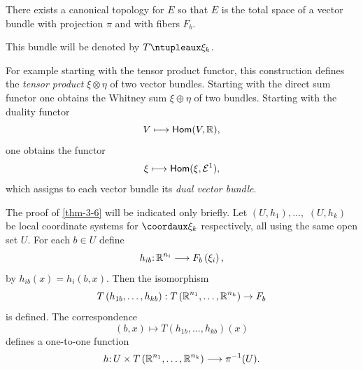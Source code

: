 \begin{theorem}\label{thm-3-6}
	There exists a canonical topology for $E$ so
	that $E$ is the total space of a vector bundle with projection $\pi$
	and with fibers $F_b$.
\end{theorem}
\begin{definition}\label{def:3-5}
	This bundle will be denoted by $T\ntuple{\xi_k}$.
\end{definition}

For example starting with the tensor product functor, this construction
defines the \textit{tensor product} $\xi\otimes\eta$ of two vector bundles. Starting with the
direct sum functor one obtains the Whitney sum $\xi\oplus\eta$ of two bundles.
Starting with the duality functor
\[V\longmapsto\mathsf{Hom}(V,\boldsymbol{\mathbb{R}}),\]
one obtains the functor
\[\xi\longmapsto\mathsf{Hom}(\xi,\mathcal{E}^1),\]
which assigns to each vector bundle its \textit{dual vector bundle}.

The proof of \cref{thm-3-6} will be indicated only briefly. Let $(U,h_1),\dots,$
$(U,h_k)$
be local coordinate systems for $\coord{\xi_k}$ respectively, all using the
same open set $U$. For each $b\in U$ define
\[h_{i b}\mathpunct{:} \boldsymbol{\mathbb{R}}^{n_{i}} \longrightarrow F_{b}\left(\xi_{i}\right),\]
by $h_{i b}(x)=h_i(b,x)$. Then the isomorphism
\[T\left(h_{1 b}, \ldots, h_{k b}\right): T\left(\boldsymbol{\mathbb{R}}^{n_{1}}, \ldots, \boldsymbol{\mathbb{R}}^{n_{k}}\right) \rightarrow F_{b}\]
is defined. The correspondence
\[(b, x) \longmapsto T\left(h_{1 b}, \ldots, h_{k b}\right)(x)\]
defines a one-to-one function
\[h\mathpunct{:} U \times T\left(\boldsymbol{\mathbb{R}}^{n_{1}}, \ldots, \boldsymbol{\mathbb{R}}^{n_{k}}\right) \longrightarrow \pi^{-1}(U).\]

